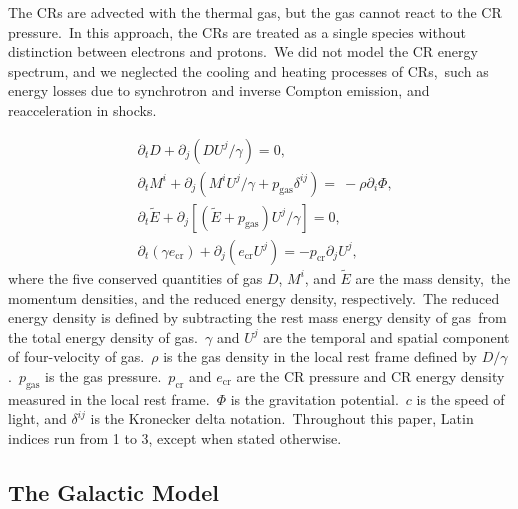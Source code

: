 \documentclass[twocolumn]{aastex631}
\begin{document}
The CRs are advected with the thermal gas, but the gas cannot react to the CR pressure.\
In this approach, the CRs are treated as a single species without distinction between electrons and protons.\
We did not model the CR energy spectrum, and we neglected the cooling and heating processes of CRs,\
such as energy losses due to synchrotron and inverse Compton emission, and reacceleration in shocks.\

\begin{subequations}
  \label{conservative-form}
  \begin{align}
   &\partial_{t} D+\partial_{j} \left(DU^{j}/\gamma\right)=0,\label{D evolution}\\
   &\partial_{t} M^{i}+\partial_{j} \left(M^{i}U^{j}/\gamma+p_{\text{gas}}\delta^{ij}\right)=\
   -\rho\partial_{i}\Phi,\label{M evolution}\\
   &\partial_{t} \tilde{E}+\partial_j \left[\left(\tilde{E}+p_{\text{gas}}\right)U^{j}/\gamma\right]=0, \label{E evoltion}\\
   &\partial_{t} \left(\gamma e_{\text{cr}}\right) + \partial_{j} \left(e_{\text{cr}}U^{j}\right)=-p_{\text{cr}} \partial_{j} U^{j},\label{D evolution}
  \end{align}
\end{subequations}
where the five conserved quantities of gas $D$, $M^{i}$, and $\tilde{E}$ are the mass density,\
the momentum densities, and the reduced energy density, respectively.\
The reduced energy density is defined by subtracting the rest mass energy density of gas\
from the total energy density of gas.\
$\gamma$ and $U^{j}$ are the temporal and spatial component of four-velocity of gas.\
$\rho$ is the gas density in the local rest frame defined by $D/\gamma$.\
$p_{\text{gas}}$ is the gas pressure.\
$p_{\text{cr}}$ and $e_{\text{cr}}$ are the CR pressure and CR energy density measured in the local rest frame.\
$\Phi$ is the gravitation potential.\
$c$ is the speed of light, and $\delta^{ij}$ is the Kronecker delta notation.\
Throughout this paper, Latin indices run from 1 to 3, except when stated otherwise.

\subsection{The Galactic Model}
\end{document}
